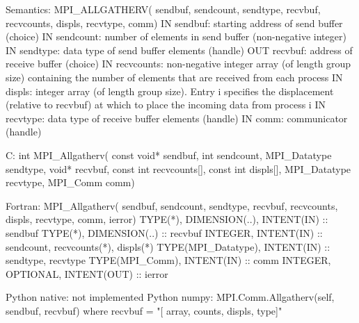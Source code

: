 Semantics:
MPI_ALLGATHERV(
    sendbuf, sendcount, sendtype, 
    recvbuf, recvcounts, displs, recvtype,
    comm)
IN sendbuf: starting address of send buffer (choice)
IN sendcount: number of elements in send buffer (non-negative integer)
IN sendtype: data type of send buffer elements (handle)
OUT recvbuf: address of receive buffer (choice)
IN recvcounts: non-negative integer array (of length group size)
    containing the number of elements that are received from each process
IN displs: integer array (of length group size). Entry i specifies the
    displacement (relative to recvbuf) at which to place the incoming data
    from process i
IN recvtype: data type of receive buffer elements (handle)
IN comm: communicator (handle)

C:
int MPI_Allgatherv(
    const void* sendbuf, int sendcount, MPI_Datatype sendtype,
    void* recvbuf, const int recvcounts[], const int displs[], MPI_Datatype recvtype,
    MPI_Comm comm) 

Fortran:
MPI_Allgatherv(
    sendbuf, sendcount, sendtype, 
    recvbuf, recvcounts, displs, recvtype,
    comm, ierror)
TYPE(*), DIMENSION(..), INTENT(IN) :: sendbuf
TYPE(*), DIMENSION(..) :: recvbuf
INTEGER, INTENT(IN) :: sendcount, recvcounts(*), displs(*)
TYPE(MPI_Datatype), INTENT(IN) :: sendtype, recvtype
TYPE(MPI_Comm), INTENT(IN) :: comm
INTEGER, OPTIONAL, INTENT(OUT) :: ierror

Python native:
not implemented
Python numpy:
MPI.Comm.Allgatherv(self, sendbuf, recvbuf)
    where recvbuf = "[ array, counts, displs, type]"

